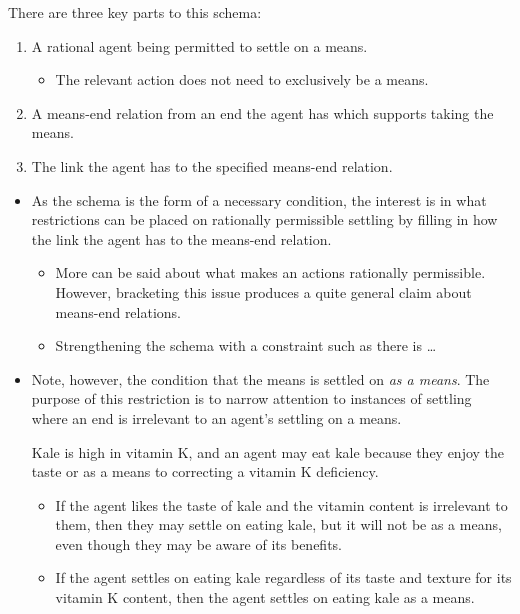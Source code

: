 \documentclass[10pt]{article}
\newcommand{\hand}{\ding{43}}
\begin{document}
There are three key parts to this schema:
\begin{enumerate}[label=\arabic*., ref=(\arabic*)]
\item A rational agent being permitted to settle on a means.
  \begin{itemize}
  \item The relevant action does not need to exclusively be a means.
  \end{itemize}
\item A means-end relation from an end the agent has which supports taking the means.
\item The link the agent has to the specified means-end relation.
\end{enumerate}

\begin{itemize}
\item[\hand] As the schema is the form of a necessary condition, the interest is in what restrictions can be placed on rationally permissible settling by filling in how the link the agent has to the means-end relation.
  \begin{itemize}
  \item More can be said about what makes an actions rationally permissible.
    However, bracketing this issue produces a quite general claim about means-end relations.
  \item {\color{red} Strengthening the schema with a constraint such as there is \dots}
  \end{itemize}
\item Note, however, the condition that the means is settled on \emph{as a means}.
  The purpose of this restriction is to narrow attention to instances of settling where an end is irrelevant to an agent's settling on a means.
  \begin{example}
    Kale is high in vitamin K, and an agent may eat kale because they enjoy the taste or as a means to correcting a vitamin K deficiency.
    \begin{itemize}
    \item If the agent likes the taste of kale and the vitamin content is irrelevant to them, then they may settle on eating kale, but it will not be as a means, even though they may be aware of its benefits.
    \item If the agent settles on eating kale regardless of its taste and texture for its vitamin K content, then the agent settles on eating kale as a means.
    \end{itemize}
  \end{example}
\end{itemize}
\end{document}

